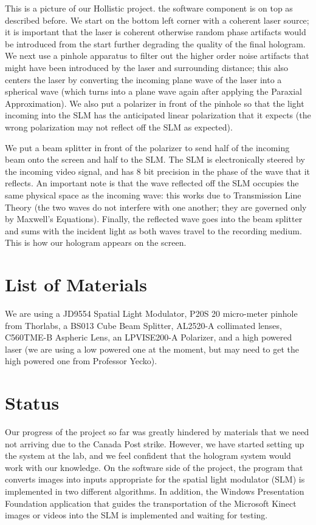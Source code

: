 \documentclass[12pt]{article}
\begin{document}
This is a picture of our Hollistic project. the software component is on top as described before. We start on the bottom left corner with a coherent laser source; it is important that the laser is coherent otherwise random phase artifacts would be introduced from the start further degrading the quality of the final hologram. We next use a pinhole apparatus to filter out the higher order noise artifacts that might have been introduced by the laser and surrounding distance; this also centers the laser by converting the incoming plane wave of the laser into a spherical wave (which turns into a plane wave again after applying the Paraxial Approximation). We also put a polarizer in front of the pinhole so that the light incoming into the SLM has the anticipated linear polarization that it expects (the wrong polarization may not reflect off the SLM as expected).

We put a beam splitter in front of the polarizer to send half of the incoming beam onto the screen and half to the SLM. The SLM is electronically steered by the incoming video signal, and has 8 bit precision in the phase of the wave that it reflects. An important note is that the wave reflected off the SLM occupies the same physical space as the incoming wave: this works due to Transmission Line Theory (the two waves do not interfere with one another; they are governed only by Maxwell's Equations). Finally, the reflected wave goes into the beam splitter and sums with the incident light as both waves travel to the recording medium. This is how our hologram appears on the screen.

\section{List of Materials}

We are using a JD9554 Spatial Light Modulator, P20S 20 micro-meter pinhole from Thorlabs, a BS013 Cube Beam Splitter, AL2520-A collimated lenses, C560TME-B Aspheric Lens, an LPVISE200-A Polarizer, and a high powered laser 
(we are using a low powered one at the moment, but may need to get the high powered one from Professor Yecko).

\section{Status}
Our progress of the project so far was greatly hindered by materials that we need not arriving due to the Canada Post strike. However, we have started setting up the system at the lab, and we feel confident that the hologram system would work with our knowledge. On the software side of the project, the program that converts images into inputs appropriate for the spatial light modulator (SLM) is implemented in two different algorithms. In addition, the Windows Presentation Foundation application that guides the transportation of the Microsoft Kinect images or videos into the SLM is implemented and waiting for testing.
\end{document}
